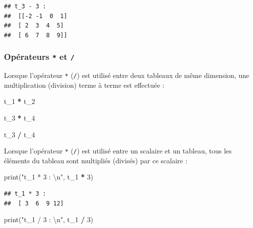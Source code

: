 \documentclass[12pt,]{book}
\newenvironment{Shaded}{\begin{snugshade}}{\end{snugshade}}
\newcommand{\DecValTok}[1]{\textcolor[rgb]{0.00,0.00,0.81}{#1}}
\newcommand{\CharTok}[1]{\textcolor[rgb]{0.31,0.60,0.02}{#1}}
\newcommand{\StringTok}[1]{\textcolor[rgb]{0.31,0.60,0.02}{#1}}
\newcommand{\OperatorTok}[1]{\textcolor[rgb]{0.81,0.36,0.00}{\textbf{#1}}}
\newcommand{\BuiltInTok}[1]{#1}
\newcommand{\NormalTok}[1]{#1}
\numberwithin{equation}{section}
\numberwithin{countremarque}{section}
\begin{document}
\begin{lstlisting}
## t_3 - 3 : 
##  [[-2 -1  0  1]
##  [ 2  3  4  5]
##  [ 6  7  8  9]]
\end{lstlisting}

\subsubsection{\texorpdfstring{Opérateurs \texttt{*} et
\texttt{/}}{Opérateurs * et /}}\label{operateurs-et}

Lorsque l'opérateur \texttt{*} (\texttt{/}) est utilisé entre deux
tableaux de même dimension, une multiplication (division) terme à terme
est effectuée :

\begin{Shaded}
\begin{Highlighting}[]
\NormalTok{t_1 }\OperatorTok{*}\NormalTok{ t_2}
\end{Highlighting}
\end{Shaded}

\begin{Shaded}
\begin{Highlighting}[]
\NormalTok{t_3 }\OperatorTok{*}\NormalTok{ t_4}
\end{Highlighting}
\end{Shaded}

\begin{Shaded}
\begin{Highlighting}[]
\NormalTok{t_3 }\OperatorTok{/}\NormalTok{ t_4}
\end{Highlighting}
\end{Shaded}

Lorsque l'opérateur \texttt{*} (\texttt{/}) est utilisé entre un
scalaire et un tableau, tous les éléments du tableau sont multipliés
(divisés) par ce scalaire :

\begin{Shaded}
\begin{Highlighting}[]
\BuiltInTok{print}\NormalTok{(}\StringTok{"t_1 * 3 : }\CharTok{\textbackslash{}n}\StringTok{"}\NormalTok{, t_1 }\OperatorTok{*} \DecValTok{3}\NormalTok{)}
\end{Highlighting}
\end{Shaded}

\begin{lstlisting}
## t_1 * 3 : 
##  [ 3  6  9 12]
\end{lstlisting}

\begin{Shaded}
\begin{Highlighting}[]
\BuiltInTok{print}\NormalTok{(}\StringTok{"t_1 / 3 : }\CharTok{\textbackslash{}n}\StringTok{"}\NormalTok{, t_1 }\OperatorTok{/} \DecValTok{3}\NormalTok{)}
\end{Highlighting}
\end{Shaded}
\end{document}
